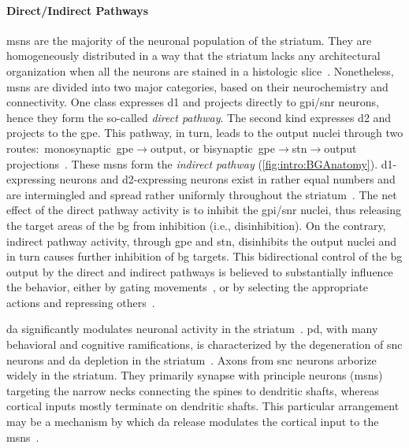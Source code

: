 \paragraph{Direct/Indirect Pathways}
\label{intro:bg:pathways}
\Glspl{msn} are the majority of the neuronal population of the striatum.
They are homogeneously distributed in a way that the striatum lacks any architectural organization when all the neurons are stained in a histologic slice~\cite{Dudman2015Book}.
Nonetheless, \glspl{msn} are divided into two major categories, based on their neurochemistry and connectivity.
One class expresses \gls{d1} and projects directly to \gls{gpi}/\gls{snr} neurons, hence they form the so-called \emph{direct pathway}\!{}.
The second kind expresses \gls{d2} and projects to the \gls{gpe}.
This pathway, in turn, leads to the output nuclei through two routes:~monosynaptic~\gls{gpe}$\rightarrow$output, or bisynaptic~\gls{gpe}$\rightarrow$\gls{stn}$\rightarrow$output projections~\cite{TURNER2000BasalFunction}.
These \glspl{msn} form the \emph{indirect pathway}\!{} (\autoref{fig:intro:BGAnatomy}).
\Gls{d1}-expressing neurons and \gls{d2}-expressing neurons exist in rather equal numbers and are intermingled and spread rather uniformly throughout the striatum~\cite{Dudman2015Book}.
The net effect of the direct pathway activity is to inhibit the \gls{gpi}/\gls{snr} nuclei, thus releasing the target areas of the \gls{bg} from inhibition (i.e., disinhibition).
On the contrary, indirect pathway activity, through \gls{gpe} and \gls{stn}, disinhibits the output nuclei and in turn causes further inhibition of \gls{bg} targets.
This bidirectional control of the \gls{bg} output by the direct and indirect pathways is believed to substantially influence the behavior, either by gating movements~\cite{Kravitz2010Nature}, or by selecting the appropriate actions and repressing others~\cite{Cui2013Nature}.
\par
\Gls{da} significantly modulates neuronal activity in the striatum~\cite{Panigrahi2015Cell}.
\Gls{pd}, with many behavioral and cognitive ramifications, is characterized by the degeneration of \gls{snc} neurons and \gls{da} depletion in the striatum~\cite[see][for a comprehensive review]{McGregor2019Neuron}.
Axons from \gls{snc} neurons arborize widely in the striatum.
They primarily synapse with principle neurons (\glspl{msn}) targeting the narrow necks connecting the spines to dendritic shafts, whereas cortical inputs mostly terminate on dendritic shafts.
This particular arrangement may be a mechanism by which \gls{da} release modulates the cortical input to the \glspl{msn}~\cite{TURNER2000BasalFunction}.
